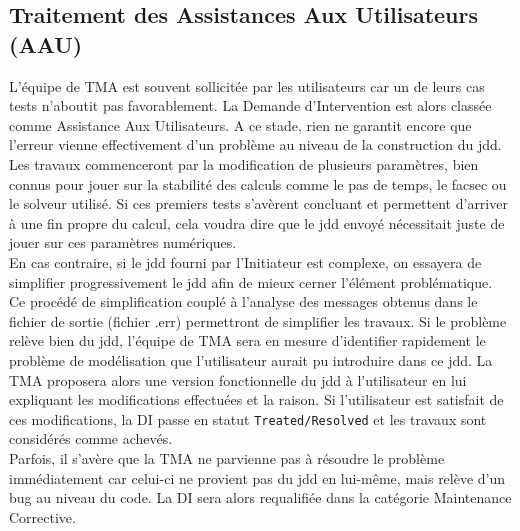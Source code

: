 \subsection{Traitement des Assistances Aux Utilisateurs (AAU)}
L'équipe de TMA est souvent sollicitée par les utilisateurs car un de leurs
cas tests n'aboutit pas favorablement. La Demande d'Intervention est alors classée
comme Assistance Aux Utilisateurs. A ce stade, rien ne garantit encore que l'erreur vienne
effectivement d'un problème au niveau de la construction du jdd. Les travaux commenceront
par la modification de plusieurs paramètres, bien connus pour jouer sur la stabilité des
calculs comme le pas de temps, le facsec ou le solveur utilisé.
Si ces premiers tests s'avèrent concluant et permettent d'arriver à une fin propre du calcul,
cela voudra dire que le jdd envoyé nécessitait juste de jouer sur ces paramètres numériques. \\
En cas contraire, si le jdd fourni par l'Initiateur est complexe, on essayera de simplifier
progressivement le jdd afin de mieux cerner l'élément problématique.
Ce procédé de simplification couplé à l'analyse des messages obtenus dans
le fichier de sortie (fichier .err) permettront de simplifier les travaux.
Si le problème relève bien du jdd, l'équipe de TMA sera en mesure d'identifier
rapidement le problème de modélisation que l'utilisateur aurait pu introduire dans ce jdd.
La TMA proposera alors une version fonctionnelle du jdd à l'utilisateur en lui expliquant les modifications effectuées et la raison. Si l'utilisateur est satisfait de ces modifications, la DI passe en statut \texttt{Treated/Resolved} et les travaux sont considérés comme achevés.\\
Parfois, il s'avère que la TMA ne parvienne pas à résoudre le problème
immédiatement car celui-ci ne provient pas du jdd en lui-même, mais relève d'un bug au niveau du code.
La DI sera alors requalifiée dans la catégorie Maintenance Corrective.\\


